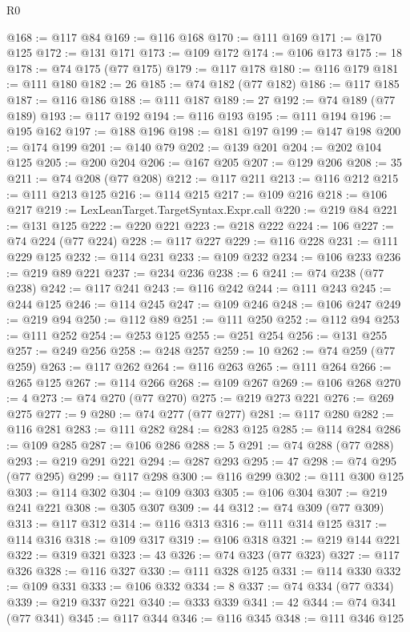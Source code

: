 \begin{lexlean}{R0}
\begin{coremodule}
@168 := @117 @84
@169 := @116 @168
@170 := @111 @169
@171 := @170 @125
@172 := @131 @171
@173 := @109 @172
@174 := @106 @173
@175 := 18
@178 := @74 @175 (@77 @175)
@179 := @117 @178
@180 := @116 @179
@181 := @111 @180
@182 := 26
@185 := @74 @182 (@77 @182)
@186 := @117 @185
@187 := @116 @186
@188 := @111 @187
@189 := 27
@192 := @74 @189 (@77 @189)
@193 := @117 @192
@194 := @116 @193
@195 := @111 @194
@196 := @195 @162
@197 := @188 @196
@198 := @181 @197
@199 := @147 @198
@200 := @174 @199
@201 := @140 @79
@202 := @139 @201
@204 := @202 @104 @125
@205 := @200 @204
@206 := @167 @205
@207 := @129 @206
@208 := 35
@211 := @74 @208 (@77 @208)
@212 := @117 @211
@213 := @116 @212
@215 := @111 @213 @125
@216 := @114 @215
@217 := @109 @216
@218 := @106 @217
@219 := LexLeanTarget.TargetSyntax.Expr.call
@220 := @219 @84
@221 := @131 @125
@222 := @220 @221
@223 := @218 @222
@224 := 106
@227 := @74 @224 (@77 @224)
@228 := @117 @227
@229 := @116 @228
@231 := @111 @229 @125
@232 := @114 @231
@233 := @109 @232
@234 := @106 @233
@236 := @219 @89 @221
@237 := @234 @236
@238 := 6
@241 := @74 @238 (@77 @238)
@242 := @117 @241
@243 := @116 @242
@244 := @111 @243
@245 := @244 @125
@246 := @114 @245
@247 := @109 @246
@248 := @106 @247
@249 := @219 @94
@250 := @112 @89
@251 := @111 @250
@252 := @112 @94
@253 := @111 @252
@254 := @253 @125
@255 := @251 @254
@256 := @131 @255
@257 := @249 @256
@258 := @248 @257
@259 := 10
@262 := @74 @259 (@77 @259)
@263 := @117 @262
@264 := @116 @263
@265 := @111 @264
@266 := @265 @125
@267 := @114 @266
@268 := @109 @267
@269 := @106 @268
@270 := 4
@273 := @74 @270 (@77 @270)
@275 := @219 @273 @221
@276 := @269 @275
@277 := 9
@280 := @74 @277 (@77 @277)
@281 := @117 @280
@282 := @116 @281
@283 := @111 @282
@284 := @283 @125
@285 := @114 @284
@286 := @109 @285
@287 := @106 @286
@288 := 5
@291 := @74 @288 (@77 @288)
@293 := @219 @291 @221
@294 := @287 @293
@295 := 47
@298 := @74 @295 (@77 @295)
@299 := @117 @298
@300 := @116 @299
@302 := @111 @300 @125
@303 := @114 @302
@304 := @109 @303
@305 := @106 @304
@307 := @219 @241 @221
@308 := @305 @307
@309 := 44
@312 := @74 @309 (@77 @309)
@313 := @117 @312
@314 := @116 @313
@316 := @111 @314 @125
@317 := @114 @316
@318 := @109 @317
@319 := @106 @318
@321 := @219 @144 @221
@322 := @319 @321
@323 := 43
@326 := @74 @323 (@77 @323)
@327 := @117 @326
@328 := @116 @327
@330 := @111 @328 @125
@331 := @114 @330
@332 := @109 @331
@333 := @106 @332
@334 := 8
@337 := @74 @334 (@77 @334)
@339 := @219 @337 @221
@340 := @333 @339
@341 := 42
@344 := @74 @341 (@77 @341)
@345 := @117 @344
@346 := @116 @345
@348 := @111 @346 @125

\end{coremodule}
\end{lexlean}
